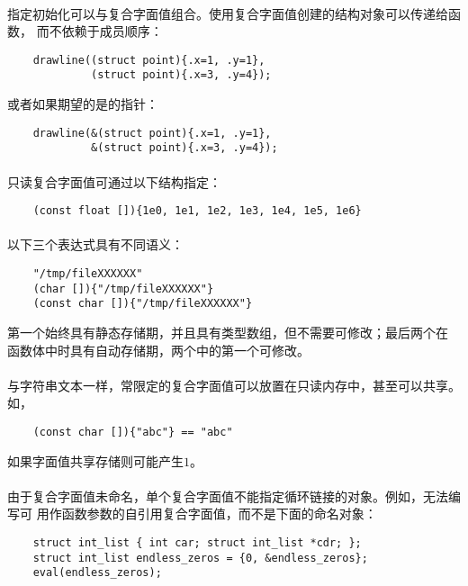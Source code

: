 \paragraph{}
\ex 指定初始化可以与复合字面值组合。使用复合字面值创建的结构对象可以传递给函数，
而不依赖于成员顺序：
\begin{lstlisting}
    drawline((struct point){.x=1, .y=1},
             (struct point){.x=3, .y=4});
\end{lstlisting}
或者如果期望的是的指针：
\begin{lstlisting}
    drawline(&(struct point){.x=1, .y=1},
             &(struct point){.x=3, .y=4});
\end{lstlisting}

\paragraph{}
\ex 只读复合字面值可通过以下结构指定：
\begin{lstlisting}
    (const float []){1e0, 1e1, 1e2, 1e3, 1e4, 1e5, 1e6}
\end{lstlisting}

\paragraph{}
\ex 以下三个表达式具有不同语义：
\begin{lstlisting}
    "/tmp/fileXXXXXX"
    (char []){"/tmp/fileXXXXXX"}
    (const char []){"/tmp/fileXXXXXX"}
\end{lstlisting}
第一个始终具有静态存储期，并且具有类型数组，但不需要可修改；最后两个在
函数体中时具有自动存储期，两个中的第一个可修改。

\paragraph{}
\ex 与字符串文本一样，常限定的复合字面值可以放置在只读内存中，甚至可以共享。如，
\begin{lstlisting}
    (const char []){"abc"} == "abc"
\end{lstlisting}
如果字面值共享存储则可能产生$1$。

\paragraph{}
\ex 由于复合字面值未命名，单个复合字面值不能指定循环链接的对象。例如，无法编写可
用作函数参数的自引用复合字面值，而不是下面的命名对象：
\begin{lstlisting}
    struct int_list { int car; struct int_list *cdr; };
    struct int_list endless_zeros = {0, &endless_zeros};
    eval(endless_zeros);
\end{lstlisting}

